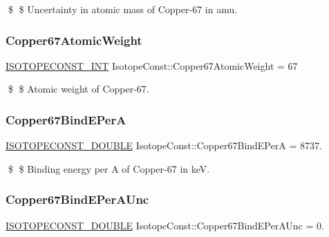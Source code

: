 \$ \$ Uncertainty in atomic mass of Copper-\/67 in amu. \mbox{\label{group___isotope_const-_copper-_cu67_gaaa2d5faaead7bbe6d3167c8138505bc0}} 
\subsubsection{\texorpdfstring{Copper67\+Atomic\+Weight}{Copper67AtomicWeight}}
{\footnotesize\ttfamily \mbox{\hyperlink{group___isotope_const-_macros_ga5f18360b3e99483a35c32d789e62621c}{I\+S\+O\+T\+O\+P\+E\+C\+O\+N\+S\+T\+\_\+\+I\+NT}} Isotope\+Const\+::\+Copper67\+Atomic\+Weight = 67}

\$ \$ Atomic weight of Copper-\/67. \mbox{\label{group___isotope_const-_copper-_cu67_ga7aa494f30ff2ae5244e0f6c22002ee00}} 
\subsubsection{\texorpdfstring{Copper67\+Bind\+E\+PerA}{Copper67BindEPerA}}
{\footnotesize\ttfamily \mbox{\hyperlink{group___isotope_const-_macros_ga8f45a7272ce02c0b4c65c44636ed719a}{I\+S\+O\+T\+O\+P\+E\+C\+O\+N\+S\+T\+\_\+\+D\+O\+U\+B\+LE}} Isotope\+Const\+::\+Copper67\+Bind\+E\+PerA = 8737.}

\$ \$ Binding energy per A of Copper-\/67 in keV. \mbox{\label{group___isotope_const-_copper-_cu67_ga4c05862ccf134751ab110a60c8712684}} 
\subsubsection{\texorpdfstring{Copper67\+Bind\+E\+Per\+A\+Unc}{Copper67BindEPerAUnc}}
{\footnotesize\ttfamily \mbox{\hyperlink{group___isotope_const-_macros_ga8f45a7272ce02c0b4c65c44636ed719a}{I\+S\+O\+T\+O\+P\+E\+C\+O\+N\+S\+T\+\_\+\+D\+O\+U\+B\+LE}} Isotope\+Const\+::\+Copper67\+Bind\+E\+Per\+A\+Unc = 0.}

